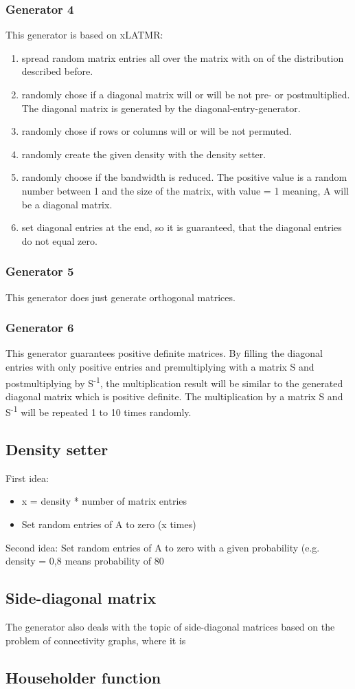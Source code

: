 \documentclass[a4paper]{article}
\begin{document}
\subsubsection{Generator 4}
This generator is based on xLATMR:
\begin{enumerate}
	\item spread random matrix entries all over the matrix with on of the distribution described before.
	\item randomly chose if a diagonal matrix will or will be not pre- or postmultiplied. The diagonal matrix is generated by the diagonal-entry-generator.
	\item randomly chose if rows or columns will or will be not permuted.
	\item randomly create the given density with the density setter.
	\item randomly choose if the bandwidth is reduced. The positive value is a random number between 1 and the size of the matrix, with value = 1 meaning, A will be a diagonal matrix.
	\item set diagonal entries at the end, so it is guaranteed, that the diagonal entries do not equal zero.
\end{enumerate}

\subsubsection{Generator 5}
This generator does just generate orthogonal matrices. 

\subsubsection{Generator 6}
This generator guarantees positive definite matrices.
By filling the diagonal entries with only positive entries and premultiplying with a matrix S and postmultiplying by S\textsuperscript{-1}, the multiplication result will be similar to the generated diagonal matrix which is positive definite. The multiplication by a matrix S and S\textsuperscript{-1} will be repeated 1 to 10 times randomly.

\subsection{Density setter}
First idea:
\begin{itemize}
	\item x = density * number of matrix entries
	\item Set random entries of A to zero (x times)
\end{itemize}
Second idea:
Set random entries of A to zero with a given probability (e.g. density = 0,8 means probability of 80%


\subsection{Side-diagonal matrix}
The generator also deals with the topic of side-diagonal matrices based on the problem of connectivity graphs, where it is

\subsection{Householder function}
\end{document}
